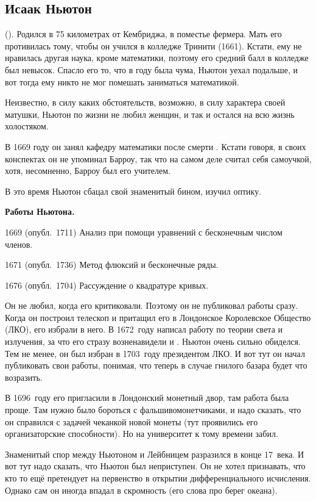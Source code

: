 \documentclass[a4paper,oneside,fleqn,10pt]{article}
\begin{document}
\subsection{Исаак Ньютон}

 (). Родился в 75 километрах
от Кембриджа, в поместье фермера. Мать его противилась тому, чтобы он учился в колледже Тринити (1661).
Кстати, ему не нравилась другая наука, кроме математики, поэтому его средний балл в колледже был невысок.
Спасло его то, что в  году была чума, Ньютон уехал подальше, и вот тогда ему никто не мог помешать заниматься
математикой.

Неизвестно, в силу каких обстоятельств, возможно, в силу характера своей матушки,
Ньютон по жизни не любил женщин, и так и остался на всю жизнь холостяком.

В 1669 году он занял кафедру математики после смерти .
Кстати говоря, в своих конспектах он не упоминал Барроу, так что на самом деле считал
себя самоучкой, хотя, несомненно, Барроу был его учителем.

В это время Ньютон сбацал свой знаменитый бином, изучил оптику.


\textbf{Работы Ньютона.}

1669 (опубл.~1711) Анализ при помощи уравнений с бесконечным числом членов.

1671 (опубл.~1736) Метод флюксий и бесконечные ряды.

1676 (опубл.~1704) Рассуждение о квадратуре кривых.

Он не любил, когда его критиковали. Поэтому он не публиковал работы сразу.
Когда он построил телескоп и притащил его в Лондонское Королевское Общество (ЛКО), его избрали в него.
В 1672~году написал работу по теории света и излучения, за что его стразу возненавидели  и .
Ньютон очень сильно обиделся. Тем не менее, он был избран в 1703~году президентом ЛКО. И вот тут он
начал публиковать свои работы, понимая, что теперь в случае гнилого базара будет что возразить.

В 1696~году его пригласили в Лондонский монетный двор, там работа была проще.
Там нужно было бороться с фальшивомонетчиками, и надо сказать, что он справился
с задачей чеканкой новой монеты (тут проявились его организаторские способности).
Но на университет к тому времени забил.

Знаменитый спор между Ньютоном и Лейбницем разразился в конце 17~века.
И вот тут надо сказать, что Ньютон был неприступен. Он не хотел признавать,
что кто то ещё претендует на первенство в открытии дифференциального исчисления.
Однако сам он иногда впадал в скромность (его слова про берег океана).
\end{document}
